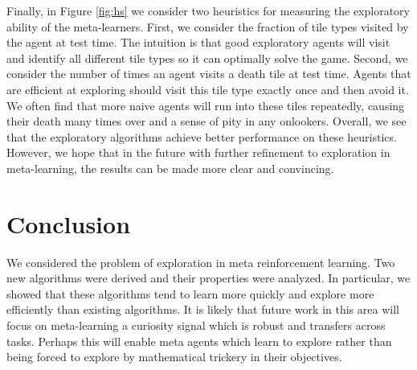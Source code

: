 \documentclass{article} %
\begin{document}
Finally, in Figure \ref{fig:hs} we consider two heuristics for measuring the exploratory ability of the meta-learners. First, we consider the fraction of tile types visited by the agent at test time. The intuition is that good exploratory agents will visit and identify all different tile types so it can optimally solve the game. Second, we consider the number of times an agent visits a death tile at test time. Agents that are efficient at exploring should visit this tile type exactly once and then avoid it. We often find that more naive agents will run into these tiles repeatedly, causing their death many times over and a sense of pity in any onlookers. Overall, we see that the exploratory algorithms achieve better performance on these heuristics. However, we hope that in the future with further refinement to exploration in meta-learning, the results can be made more clear and convincing. 

\section{Conclusion} 
We considered the problem of exploration in meta reinforcement learning. Two new algorithms were derived and their properties were analyzed. In particular, we showed that these algorithms tend to learn more quickly and explore more efficiently than existing algorithms. It is likely that future work in this area will focus on meta-learning a curiosity signal which is robust and transfers across tasks. Perhaps this will enable meta agents which learn to explore rather than being forced to explore by mathematical trickery in their objectives. 
\end{document}
